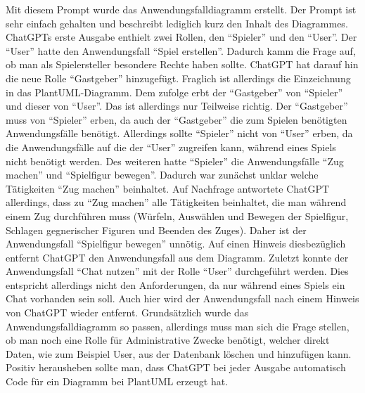 Mit diesem Prompt wurde das Anwendungsfalldiagramm erstellt. Der Prompt ist sehr einfach gehalten und beschreibt lediglich kurz den Inhalt des Diagrammes.\\

ChatGPTs erste Ausgabe enthielt zwei Rollen, den ``Spieler'' und den ``User''. Der ``User'' hatte den Anwendungsfall ``Spiel erstellen''. Dadurch kamm die 
Frage auf, ob man als Spielersteller besondere Rechte haben sollte. ChatGPT hat darauf hin die neue Rolle ``Gastgeber'' hinzugefügt. Fraglich ist allerdings
die Einzeichnung in das PlantUML-Diagramm. Dem zufolge erbt der ``Gastgeber'' von ``Spieler'' und dieser von ``User''. Das ist allerdings nur Teilweise richtig.
Der ``Gastgeber'' muss von ``Spieler'' erben, da auch der ``Gastgeber'' die zum Spielen benötigten Anwendungsfälle benötigt. Allerdings sollte ``Spieler'' nicht 
von ``User'' erben, da die Anwendungsfälle auf die der ``User'' zugreifen kann, während eines Spiels nicht benötigt werden. Des weiteren hatte ``Spieler'' die 
Anwendungsfälle ``Zug machen'' und ``Spielfigur bewegen''. Dadurch war zunächst unklar welche Tätigkeiten ``Zug machen'' beinhaltet. Auf Nachfrage antwortete 
ChatGPT allerdings, dass zu ``Zug machen'' alle Tätigkeiten beinhaltet, die man während einem Zug durchführen muss (Würfeln, Auswählen und Bewegen der Spielfigur, 
Schlagen gegnerischer Figuren und Beenden des Zuges). Daher ist der Anwendungsfall ``Spielfigur bewegen'' unnötig. Auf einen Hinweis diesbezüglich entfernt ChatGPT 
den Anwendungsfall aus dem Diagramm. Zuletzt konnte der Anwendungsfall ``Chat nutzen'' mit der Rolle ``User'' durchgeführt werden. Dies entspricht allerdings nicht 
den Anforderungen, da nur während eines Spiels ein Chat vorhanden sein soll. Auch hier wird der Anwendungsfall nach einem Hinweis von ChatGPT wieder entfernt. 
Grundsätzlich wurde das Anwendungsfalldiagramm so passen, allerdings muss man sich die Frage stellen, ob man noch eine Rolle für Administrative Zwecke benötigt, 
welcher direkt Daten, wie zum Beispiel User, aus der Datenbank löschen und hinzufügen kann. Positiv herausheben sollte man, dass ChatGPT bei jeder Ausgabe 
automatisch Code für ein Diagramm bei PlantUML erzeugt hat.\\

